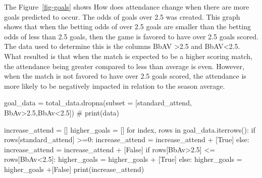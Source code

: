 \documentclass[
  letterpaper,
  DIV=11,
  numbers=noendperiod]{scrartcl}
\newenvironment{Shaded}{\begin{snugshade}}{\end{snugshade}}
\newcommand{\BuiltInTok}[1]{\textcolor[rgb]{0.00,0.23,0.31}{#1}}
\newcommand{\CommentTok}[1]{\textcolor[rgb]{0.37,0.37,0.37}{#1}}
\newcommand{\ControlFlowTok}[1]{\textcolor[rgb]{0.00,0.23,0.31}{#1}}
\newcommand{\DecValTok}[1]{\textcolor[rgb]{0.68,0.00,0.00}{#1}}
\newcommand{\KeywordTok}[1]{\textcolor[rgb]{0.00,0.23,0.31}{#1}}
\newcommand{\NormalTok}[1]{\textcolor[rgb]{0.00,0.23,0.31}{#1}}
\newcommand{\OperatorTok}[1]{\textcolor[rgb]{0.37,0.37,0.37}{#1}}
\newcommand{\StringTok}[1]{\textcolor[rgb]{0.13,0.47,0.30}{#1}}
\newcommand{\VariableTok}[1]{\textcolor[rgb]{0.07,0.07,0.07}{#1}}
\begin{document}
The Figure~\ref{fig-goals} shows How does attendance change when there
are more goals predicted to occur. The odds of goals over 2.5 was
created. This graph shows that when the betting odds of over 2.5 goals
are smaller than the betting odds of less than 2.5 goals, then the game
is favored to have over 2.5 goals scored. The data used to determine
this is the columns BbAV \textgreater2.5 and BbAV\textless2.5. What
resulted is that when the match is expected to be a higher scoring
match, the attendance being greater compared to less than average is
even. However, when the match is not favored to have over 2.5 goals
scored, the attendance is more likely to be negatively impacted in
relation to the season average.

\begin{Shaded}
\begin{Highlighting}[]
\NormalTok{goal\_data }\OperatorTok{=}\NormalTok{ total\_data.dropna(subset }\OperatorTok{=}\NormalTok{ [}\StringTok{\textquotesingle{}standard\_attend\textquotesingle{}}\NormalTok{, }\StringTok{\textquotesingle{}BbAv\textgreater{}2.5\textquotesingle{}}\NormalTok{,}\StringTok{\textquotesingle{}BbAv\textless{}2.5\textquotesingle{}}\NormalTok{])}
\CommentTok{\# print(data)}

\NormalTok{increase\_attend }\OperatorTok{=}\NormalTok{ []}
\NormalTok{higher\_goals }\OperatorTok{=}\NormalTok{ []}
\ControlFlowTok{for}\NormalTok{ index, rows }\KeywordTok{in}\NormalTok{ goal\_data.iterrows():}
    \ControlFlowTok{if}\NormalTok{ rows[}\StringTok{\textquotesingle{}standard\_attend\textquotesingle{}}\NormalTok{] }\OperatorTok{\textgreater{}=}\DecValTok{0}\NormalTok{:}
\NormalTok{        increase\_attend }\OperatorTok{=}\NormalTok{ increase\_attend }\OperatorTok{+}\NormalTok{ [}\VariableTok{True}\NormalTok{]}
    \ControlFlowTok{else}\NormalTok{:}
\NormalTok{        increase\_attend }\OperatorTok{=}\NormalTok{ increase\_attend }\OperatorTok{+}\NormalTok{ [}\VariableTok{False}\NormalTok{]}
    \ControlFlowTok{if}\NormalTok{ rows[}\StringTok{\textquotesingle{}BbAv\textgreater{}2.5\textquotesingle{}}\NormalTok{] }\OperatorTok{\textless{}=}\NormalTok{ rows[}\StringTok{\textquotesingle{}BbAv\textless{}2.5\textquotesingle{}}\NormalTok{]:}
\NormalTok{        higher\_goals }\OperatorTok{=}\NormalTok{ higher\_goals }\OperatorTok{+}\NormalTok{ [}\VariableTok{True}\NormalTok{]}
    \ControlFlowTok{else}\NormalTok{:}
\NormalTok{        higher\_goals }\OperatorTok{=}\NormalTok{ higher\_goals }\OperatorTok{+}\NormalTok{[}\VariableTok{False}\NormalTok{]}
\BuiltInTok{print}\NormalTok{(increase\_attend)}


\end{Highlighting}
\end{Shaded}
\end{document}
